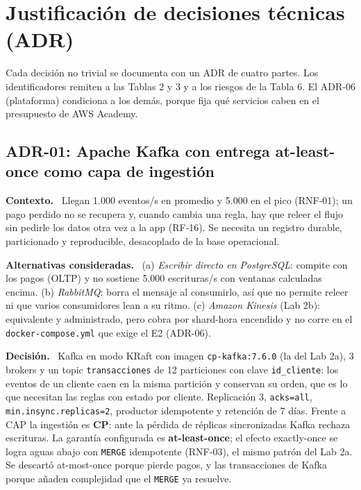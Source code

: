 \documentclass[12pt,letterpaper]{article}
\newcommand{\code}[1]{{\small\texttt{#1}}}
\newcommand{\adrpart}[1]{\textbf{#1.}~}
\begin{document}
{\begin{landscape}
\begin{center}
2YZZRnScQ48lxjyfq7c5PJ1ZAXASafL\%2BiW8jhPQ\%2B8Z8wsIcY5gzMYJNedQQMifIY1GTzYUFNRoOnejzTZK0OB5ExTFCbYoxqtG\%2FTBFsDNbdV6\%2BXnlm9yYZfhU9MTuFm6XP5HlYEujk7QGiNhiV7RmvY5DSW0HqBwPccJX7b2mxBUS0R4pIUqHBPHPU4hjzY8\%2Fq3tVRkL6scCrVXkVKo5JofTKmcYxYQQgyD3RcmOtdcl3mOo7IBA0\%2BIPyBbGu2krrQ2dasIwm1MJVmCABfxhHJwNh5KAnj\%2FxZ5aHeH50MsDjalm8gq4sv\%2FBw\%3D\%3D}{abrir el diagrama en app.diagrams.net}. Archivo fuente: \path{arquitectura.drawio}.
\end{center}
\end{landscape}
\restoregeometry
}

\section{Justificación de decisiones técnicas (ADR)}

Cada decisión no trivial se documenta con un ADR de cuatro partes. Los identificadores remiten a las Tablas 2 y 3 y a los riesgos de la Tabla 6. El ADR-06 (plataforma) condiciona a los demás, porque fija qué servicios caben en el presupuesto de AWS Academy.

\subsection*{ADR-01: Apache Kafka con entrega at-least-once como capa de ingestión}

\adrpart{Contexto} Llegan 1.000 eventos/s en promedio y 5.000 en el pico (RNF-01); un pago perdido no se recupera y, cuando cambia una regla, hay que releer el flujo sin pedirle los datos otra vez a la app (RF-16). Se necesita un registro durable, particionado y reproducible, desacoplado de la base operacional.

\adrpart{Alternativas consideradas} (a) \emph{Escribir directo en PostgreSQL}: compite con los pagos (OLTP) y no sostiene 5.000 escrituras/s con ventanas calculadas encima. (b) \emph{RabbitMQ}: borra el mensaje al consumirlo, así que no permite releer ni que varios consumidores lean a su ritmo. (c) \emph{Amazon Kinesis} (Lab 2b): equivalente y administrado, pero cobra por shard-hora encendido y no corre en el \code{docker-compose.yml} que exige el E2 (ADR-06).

\adrpart{Decisión} Kafka en modo KRaft con imagen \code{cp-kafka:7.6.0} (la del Lab 2a), 3 brokers y un topic \code{transacciones} de 12 particiones con clave \code{id\_cliente}: los eventos de un cliente caen en la misma partición y conservan su orden, que es lo que necesitan las reglas con estado por cliente. Replicación 3, \code{acks=all}, \code{min.insync.replicas=2}, productor idempotente y retención de 7 días. Frente a CAP la ingestión es \textbf{CP}: ante la pérdida de réplicas sincronizadas Kafka rechaza escrituras. La garantía configurada es \textbf{at-least-once}; el efecto exactly-once se logra aguas abajo con \code{MERGE} idempotente (RNF-03), el mismo patrón del Lab 2a. Se descartó at-most-once porque pierde pagos, y las transacciones de Kafka porque añaden complejidad que el \code{MERGE} ya resuelve.
\end{document}
